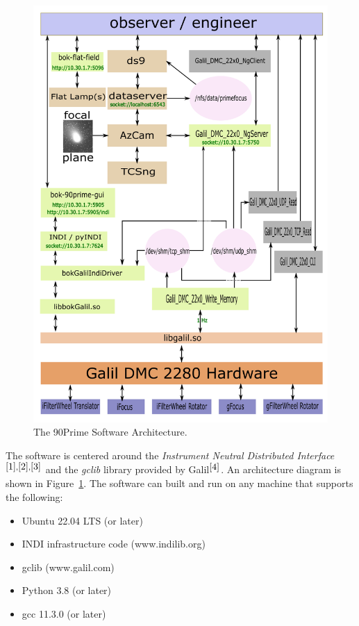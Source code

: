 \documentclass[12pt,twoside]{article}
\begin{document}
\begin{figure}
 \centering
 \includegraphics[angle=0,scale=0.75]{bokGalilIndiDriver.png}
 \caption{The 90Prime Software Architecture.}
 \label{bokGalilIndiDriver}
\end{figure}

The software is centered around the \emph{Instrument Neutral Distributed Interface}$^{\cite{1}, \cite{2}, \cite{3}}$
and the \emph{gclib} library provided by Galil$^{\cite{4}}$. An architecture diagram is shown in Figure~\ref{bokGalilIndiDriver}.
The software can built and run on any machine that supports the following:

\begin{itemize}
\item Ubuntu 22.04 LTS (or later)
\item INDI infrastructure code (www.indilib.org)
\item gclib (www.galil.com)
\item Python 3.8 (or later)
\item gcc 11.3.0 (or later)
\end{itemize}
\end{document}
